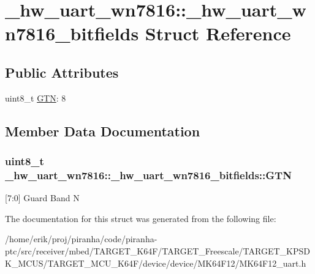 \hypertarget{struct__hw__uart__wn7816_1_1__hw__uart__wn7816__bitfields}{}\section{\+\_\+hw\+\_\+uart\+\_\+wn7816\+:\+:\+\_\+hw\+\_\+uart\+\_\+wn7816\+\_\+bitfields Struct Reference}
\label{struct__hw__uart__wn7816_1_1__hw__uart__wn7816__bitfields}
\subsection*{Public Attributes}
\begin{DoxyCompactItemize}
\item 
uint8\+\_\+t \hyperlink{struct__hw__uart__wn7816_1_1__hw__uart__wn7816__bitfields_a4239b7d10de2a75cad50340858b41304}{G\+TN}\+: 8
\end{DoxyCompactItemize}


\subsection{Member Data Documentation}
\subsubsection[{\texorpdfstring{G\+TN}{GTN}}]{\setlength{\rightskip}{0pt plus 5cm}uint8\+\_\+t \+\_\+hw\+\_\+uart\+\_\+wn7816\+::\+\_\+hw\+\_\+uart\+\_\+wn7816\+\_\+bitfields\+::\+G\+TN}\hypertarget{struct__hw__uart__wn7816_1_1__hw__uart__wn7816__bitfields_a4239b7d10de2a75cad50340858b41304}{}\label{struct__hw__uart__wn7816_1_1__hw__uart__wn7816__bitfields_a4239b7d10de2a75cad50340858b41304}
\mbox{[}7\+:0\mbox{]} Guard Band N 

The documentation for this struct was generated from the following file\+:\begin{DoxyCompactItemize}
\item 
/home/erik/proj/piranha/code/piranha-\/ptc/src/receiver/mbed/\+T\+A\+R\+G\+E\+T\+\_\+\+K64\+F/\+T\+A\+R\+G\+E\+T\+\_\+\+Freescale/\+T\+A\+R\+G\+E\+T\+\_\+\+K\+P\+S\+D\+K\+\_\+\+M\+C\+U\+S/\+T\+A\+R\+G\+E\+T\+\_\+\+M\+C\+U\+\_\+\+K64\+F/device/device/\+M\+K64\+F12/M\+K64\+F12\+\_\+uart.\+h\end{DoxyCompactItemize}
